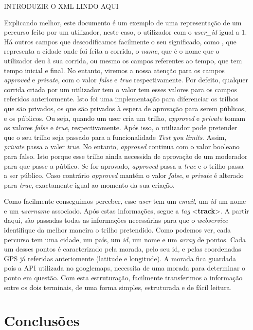 \documentclass[twocolumn,twoside,10pt,a4paper]{article}
\begin{document}
INTRODUZIR O XML LINDO AQUI

Explicando melhor, este documento é um exemplo de uma representação de um percurso feito por um utilizador, neste caso, o utilizador com o \textit{user_id} igual a 1. Há outros campos que descodificamos facilmente o seu significado, como , que representa a cidade onde foi feita a corrida, o \textit{name}, que é o nome que o utilizador deu à sua corrida, ou mesmo os campos referentes ao tempo, que tem tempo inicial e final. No entanto, viremos a nossa atenção para os campos \textit{approved} e \textit{private}, com o valor \textit{false} e \textit{true} respectivamente. Por defeito, qualquer corrida criada por um utilizador tem o valor tem esses valores para os campos referidos anteriormente. Isto foi uma implementação para diferenciar os trilhos que são privados, os que são privados à espera de aprovação para serem públicos, e os públicos. Ou seja, quando um user cria um trilho, \textit{approved} e \textit{private} tomam os valores \textit{false} e \textit{true}, respectivamente. Após isso, o utilizador pode pretender que o seu trilho seja passado para a funcionalidade \textit{Test you limits}. Assim, \textit{private} passa a valer \textit{true}. No entanto, \textit{approved} continua com o valor booleano para falso. Isto porque esse trilho ainda necessida de aprovação de um moderador para que passe a público. Se for aprovado, \textit{approved} passa a \textit{true} e o trilho passa a ser público. Caso contrário \textit{approved} mantém o valor \textit{false}, e \textit{private} é alterado para \textit{true}, exactamente igual ao momento da sua criação.

Como facilmente conseguimos perceber, esse \textit{user} tem um \textit{email}, um \textit{id} um nome e um \textit{username} associado. Após estas informações, segue a \textit{tag} <\textbf{track}>. A partir daqui, são passadas todas as informações necessárias para que o \textit{webservice} identifique da melhor maneira o trilho pretendido. Como podemos ver, cada percurso tem uma cidade, um país, um \textit{id}, um nome e um \textit{array} de pontos. Cada um desses pontos é caracterizado pela morada, pelo seu id, e pelas coordenadas GPS já referidas anteriomente (latitude e longitude). A morada fica guardada pois a API utilizada no googlemaps, necessita de uma morada para determinar o ponto em questão. Com esta estruturação, facilmente transferimos a informação entre os dois terminais, de uma forma simples, estruturada e de fácil leitura.


\section{Conclusões}\label{sec:conclusions}
\end{document}
